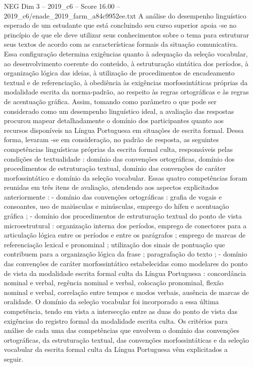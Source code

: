 \begin{textsample}{NEG Dim 3 – 2019\_c6 – Score 16.00 – 2019\_c6/enade\_2019\_farm\_a84c9952ee.txt}
A análise do desempenho linguístico esperado de um estudante que está concluindo seu curso superior apoia -se no princípio de que ele deve utilizar seus conhecimentos sobre o tema para estruturar seus textos de acordo com as características formais da situação comunicativa.
Essa configuração determina exigências quanto à adequação da seleção vocabular, ao desenvolvimento coerente do conteúdo, à estruturação sintática dos períodos, à organização lógica das ideias, à utilização de procedimentos de encadeamento textual e de referenciação, à obediência às exigências morfossintáticas próprias da modalidade escrita da norma-padrão, ao respeito às regras ortográficas e às regras de acentuação gráfica.
Assim, tomando como parâmetro o que pode ser considerado como um desempenho linguístico ideal, a avaliação das respostas procurou mapear detalhadamente o domínio dos participantes quanto aos recursos disponíveis na Língua Portuguesa em situações de escrita formal.
Dessa forma, levaram -se em consideração, no padrão de resposta, as seguintes competências linguísticas próprias da escrita formal culta, responsáveis pelas condições de textualidade : domínio das convenções ortográficas, domínio dos procedimentos de estruturação textual, domínio das convenções de caráter morfossintático e domínio da seleção vocabular.
Essas quatro competências foram reunidas em três itens de avaliação, atendendo aos aspectos explicitados anteriormente : - domínio das convenções ortográficas : grafia de vogais e consoantes, uso de maiúsculas e minúsculas, emprego do hífen e acentuação gráfica ; - domínio dos procedimentos de estruturação textual do ponto de vista microestrutural : organização interna dos períodos, emprego de conectores para a articulação lógica entre os períodos e entre os parágrafos ; emprego de marcas de referenciação lexical e pronominal ; utilização dos sinais de pontuação que contribuem para a organização lógica da frase ; paragrafação do texto ; - domínio das convenções de caráter morfossintático estabelecidas como modelares do ponto de vista da modalidade escrita formal culta da Língua Portuguesa : concordância nominal e verbal, regência nominal e verbal, colocação pronominal, flexão nominal e verbal, correlação entre tempos e modos verbais, ausência de marcas de oralidade.
O domínio da seleção vocabular foi incorporado a essa última competência, tendo em vista a intersecção entre as duas do ponto de vista das exigências do registro formal da modalidade escrita culta.
Os critérios para análise de cada uma das competências que envolvem o domínio das convenções ortográficas, da estruturação textual, das convenções morfossintáticas e da seleção vocabular da escrita formal culta da Língua Portuguesa vêm explicitados a seguir.

\end{textsample}
